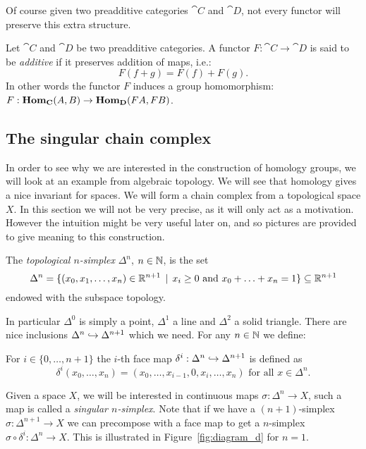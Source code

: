 Of course given two preadditive categories $\cat{C}$ and $\cat{D}$, not every functor will preserve this extra structure.
\begin{definition}
	Let $\cat{C}$ and $\cat{D}$ be two preadditive categories. A functor $F: \cat{C} \to \cat{D}$ is said to be \emph{additive} if it preserves addition of maps, i.e.:
	$$ F(f + g) = F(f) + F(g). $$
	In other words the functor $F$ induces a group homomorphism: $F : \mathbf{Hom}_{\mathbf{C}}(A, B) \to \mathbf{Hom}_{\mathbf{D}}(FA, FB)$.
\end{definition}

\subsection{The singular chain complex}
In order to see why we are interested in the construction of homology groups, we will look at an example from algebraic topology. We will see that homology gives a nice invariant for spaces. We will form a chain complex from a topological space $X$. In this section we will not be very precise, as it will only act as a motivation. However the intuition might be very useful later on, and so pictures are provided to give meaning to this construction.

\begin{definition}
	The \emph{topological $n$-simplex} $\Delta^n$, $n \in \mathbb{N}$, is the set
	$$ \Delta^n = \{(x_0, x_1, \ldots, x_n) \in \mathbb{R}^{n+1} \,\mid\, x_i \geq 0 \text{ and } x_0 + \ldots + x_n = 1 \} \subseteq \mathbb{R}^{n+1} $$
	endowed with the subspace topology.
\end{definition}

In particular $\Delta^0$ is simply a point, $\Delta^1$ a line and $\Delta^2$ a solid triangle. There are nice inclusions $\Delta^n \hookrightarrow \Delta^{n+1}$ which we need. For any $n \in \mathbb{N}$ we define:
\begin{definition}
	For $i \in \{0, \ldots, n+1\}$ the $i$-th face map $\delta^i : \Delta^n \hookrightarrow \Delta^{n+1}$ is defined as
	$$ \delta^i (x_0, \ldots, x_n) = (x_0, \ldots, x_{i-1}, 0, x_{i}, \ldots, x_n) \text{ for all } x \in \Delta^n.$$
\end{definition}

Given a space $X$, we will be interested in continuous maps $\sigma : \Delta^n \to X$, such a map is called a \emph{singular $n$-simplex}. Note that if we have a $(n+1)$-simplex $\sigma : \Delta^{n+1} \to X$ we can precompose with a face map to get a $n$-simplex $\sigma \circ \delta^i : \Delta^n \to X$. This is illustrated in Figure~\ref{fig:diagram_d} for $n=1$.

